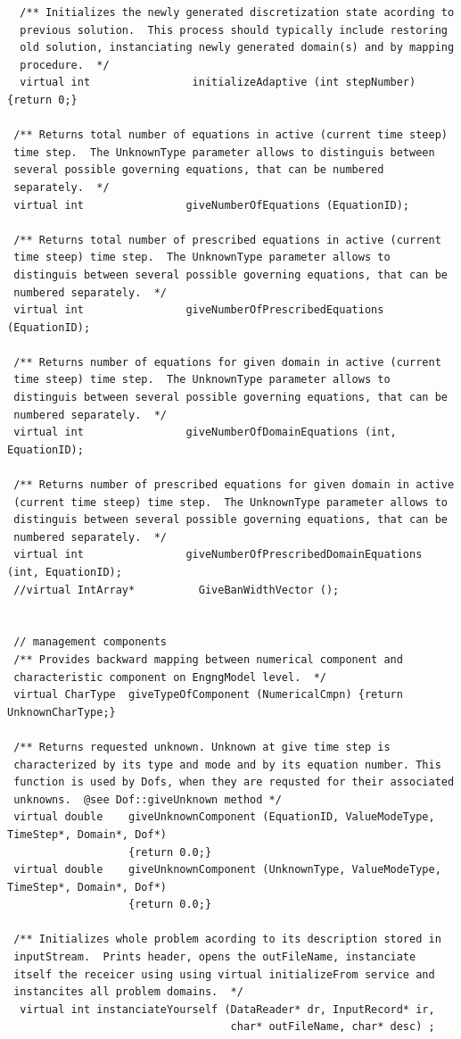 \documentclass[a4paper]{article}
\begin{document}
{\begin{verbatim}
  /** Initializes the newly generated discretization state acording to
  previous solution.  This process should typically include restoring
  old solution, instanciating newly generated domain(s) and by mapping
  procedure.  */
  virtual int                initializeAdaptive (int stepNumber) {return 0;}

 /** Returns total number of equations in active (current time steep)
 time step.  The UnknownType parameter allows to distinguis between
 several possible governing equations, that can be numbered
 separately.  */
 virtual int                giveNumberOfEquations (EquationID);

 /** Returns total number of prescribed equations in active (current
 time steep) time step.  The UnknownType parameter allows to
 distinguis between several possible governing equations, that can be
 numbered separately.  */
 virtual int                giveNumberOfPrescribedEquations (EquationID);

 /** Returns number of equations for given domain in active (current
 time steep) time step.  The UnknownType parameter allows to
 distinguis between several possible governing equations, that can be
 numbered separately.  */
 virtual int                giveNumberOfDomainEquations (int, EquationID);

 /** Returns number of prescribed equations for given domain in active
 (current time steep) time step.  The UnknownType parameter allows to
 distinguis between several possible governing equations, that can be
 numbered separately.  */
 virtual int                giveNumberOfPrescribedDomainEquations (int, EquationID);
 //virtual IntArray*          GiveBanWidthVector ();
      

 // management components
 /** Provides backward mapping between numerical component and
 characteristic component on EngngModel level.  */
 virtual CharType  giveTypeOfComponent (NumericalCmpn) {return UnknownCharType;}

 /** Returns requested unknown. Unknown at give time step is
 characterized by its type and mode and by its equation number. This
 function is used by Dofs, when they are requsted for their associated
 unknowns.  @see Dof::giveUnknown method */
 virtual double    giveUnknownComponent (EquationID, ValueModeType, TimeStep*, Domain*, Dof*) 
                   {return 0.0;}
 virtual double    giveUnknownComponent (UnknownType, ValueModeType, TimeStep*, Domain*, Dof*) 
                   {return 0.0;}

 /** Initializes whole problem acording to its description stored in
 inputStream.  Prints header, opens the outFileName, instanciate
 itself the receicer using using virtual initializeFrom service and
 instancites all problem domains.  */
  virtual int instanciateYourself (DataReader* dr, InputRecord* ir, 
                                   char* outFileName, char* desc) ;


\end{verbatim}}
\end{document}
